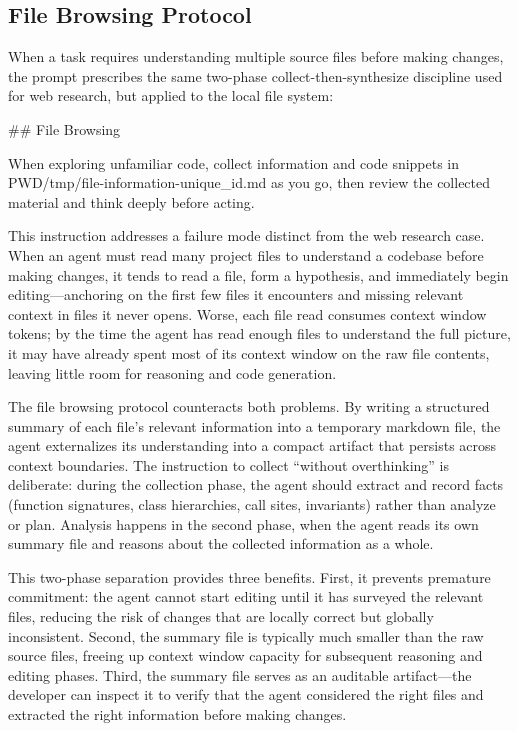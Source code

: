 \documentclass{article}
\begin{document}
\subsection{File Browsing Protocol}

When a task requires understanding multiple source files before making changes, the prompt prescribes the same two-phase collect-then-synthesize discipline used for web research, but applied to the local file system:

\begin{prompt}
## File Browsing

When exploring unfamiliar code, collect information and
code snippets in PWD/tmp/file-information-{unique_id}.md
as you go, then review the collected material and think
deeply before acting.
\end{prompt}

\noindent This instruction addresses a failure mode distinct from the web research case.  When an agent must read many project files to understand a codebase before making changes, it tends to read a file, form a hypothesis, and immediately begin editing---anchoring on the first few files it encounters and missing relevant context in files it never opens.  Worse, each file read consumes context window tokens; by the time the agent has read enough files to understand the full picture, it may have already spent most of its context window on the raw file contents, leaving little room for reasoning and code generation.

The file browsing protocol counteracts both problems.  By writing a structured summary of each file's relevant information into a temporary markdown file, the agent externalizes its understanding into a compact artifact that persists across context boundaries.  The instruction to collect ``without overthinking'' is deliberate: during the collection phase, the agent should extract and record facts (function signatures, class hierarchies, call sites, invariants) rather than analyze or plan.  Analysis happens in the second phase, when the agent reads its own summary file and reasons about the collected information as a whole.

This two-phase separation provides three benefits.  First, it prevents premature commitment: the agent cannot start editing until it has surveyed the relevant files, reducing the risk of changes that are locally correct but globally inconsistent.  Second, the summary file is typically much smaller than the raw source files, freeing up context window capacity for subsequent reasoning and editing phases.  Third, the summary file serves as an auditable artifact---the developer can inspect it to verify that the agent considered the right files and extracted the right information before making changes.
\end{document}
